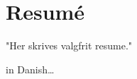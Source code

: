 \EnableQuotes{}
\chapter{Resumé}
"Her skrives valgfrit resume."

in Danish\dots
{}
\EnableQuotes{}

